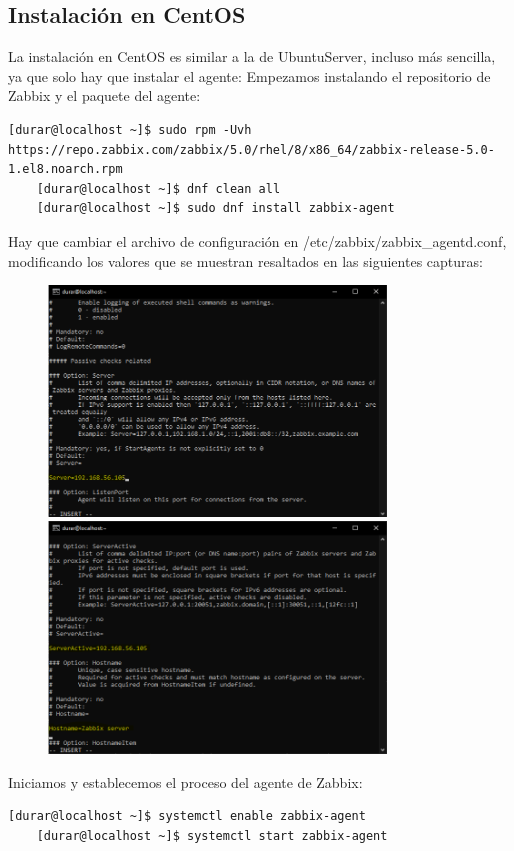 \documentclass[a4paper]{article}
\begin{document}
\subsection*{Instalación en CentOS}
La instalación en CentOS es similar a la de UbuntuServer, incluso más sencilla, ya que
solo hay que instalar el agente:
Empezamos instalando el repositorio de Zabbix y el paquete del agente:
\begin{lstlisting}[style=bashCentOS]
    [durar@localhost ~]$ sudo rpm -Uvh https://repo.zabbix.com/zabbix/5.0/rhel/8/x86_64/zabbix-release-5.0-1.el8.noarch.rpm
    [durar@localhost ~]$ dnf clean all
    [durar@localhost ~]$ sudo dnf install zabbix-agent
\end{lstlisting}
Hay que cambiar el archivo de configuración en /etc/zabbix/zabbix\_agentd.conf, modificando los valores 
que se muestran resaltados en las siguientes capturas:
\newpage
\begin{figure}
    \centering
    \includegraphics[width=0.8\textwidth]{cambiandoConfZabbigAgent1.png}
    \includegraphics[width=0.8\textwidth]{cambiandoConfZabbigAgent2.png}
\end{figure}
Iniciamos y establecemos el proceso del agente de Zabbix:
\begin{lstlisting}[style=bashCentOS]
    [durar@localhost ~]$ systemctl enable zabbix-agent
    [durar@localhost ~]$ systemctl start zabbix-agent
\end{lstlisting}
\end{document}
